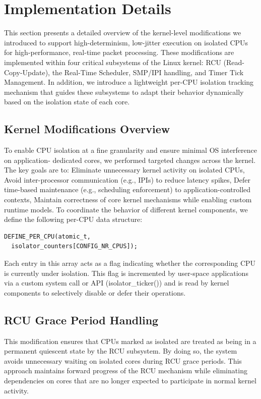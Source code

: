 \documentclass[letterpaper]{article}
\begin{document}
\section{Implementation Details}
This section presents a detailed overview of the kernel-level modifications we introduced to
support high-determinism, low-jitter execution on isolated CPUs for high-performance, real-time
packet processing. These modifications are implemented within four critical subsystems of the
Linux kernel: RCU (Read-Copy-Update), the Real-Time Scheduler, SMP/IPI handling, and Timer Tick
Management. In addition, we introduce a lightweight per-CPU isolation tracking mechanism that
guides these subsystems to adapt their behavior dynamically based on the isolation state of each
core.

\subsection{Kernel Modifications Overview}
To enable CPU isolation at a fine granularity and ensure minimal OS interference on application-
dedicated cores, we performed targeted changes across the kernel. The key goals are to:
Eliminate unnecessary kernel activity on isolated CPUs,
Avoid inter-processor communication (e.g., IPIs) to reduce latency spikes,
Defer time-based maintenance (e.g., scheduling enforcement) to application-controlled contexts,
Maintain correctness of core kernel mechanisms while enabling custom runtime models.
To coordinate the behavior of different kernel components, we define the following per-CPU data
structure:
\begin{verbatim}
DEFINE_PER_CPU(atomic_t,
  isolator_counters[CONFIG_NR_CPUS]);
\end{verbatim}
Each entry in this array acts as a flag indicating whether the corresponding CPU is currently under
isolation. This flag is incremented by user-space applications via a custom system call or API
(isolator\_ticker()) and is read by kernel components to selectively disable or defer their operations.


\subsection{RCU Grace Period Handling}
This modification ensures that CPUs marked as isolated are treated as being in a permanent
quiescent state by the RCU subsystem. By doing so, the system avoids unnecessary waiting on
isolated cores during RCU grace periods. This approach maintains forward progress of the RCU
mechanism while eliminating dependencies on cores that are no longer expected to participate in
normal kernel activity.
\end{document}
